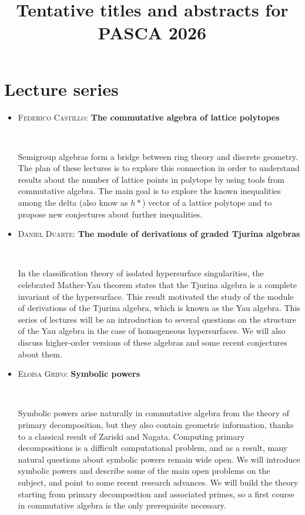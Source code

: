 \documentclass[12pt]{amsart}
\begin{document}
\title{Tentative titles and abstracts for PASCA 2026}
\maketitle

\section*{Lecture series}

\vfill


\begin{itemize}

\item \textsc{Federico Castillo:} \textbf{The commutative algebra of lattice polytopes}

\

\noindent Semigroup algebras form a bridge between ring theory and discrete geometry. The plan of these lectures is to explore this connection in order to understand results about the number of lattice points in polytope by using tools from commutative algebra. The main goal is to explore the known inequalities among the delta (also know as $h*$) vector of a lattice polytope and to propose new conjectures about further inequalities.

\vfill

\item  \textsc{Daniel Duarte:} \textbf{The module of derivations of graded Tjurina algebras}

\

\noindent In the classification theory of isolated hypersurface singularities, the celebrated Mather-Yau theorem states that the Tjurina algebra is a complete invariant of the hypersurface. This result motivated the study of the module of derivations of the Tjurina algebra, which is known as the Yau algebra. This series of lectures will be an introduction to several questions on the structure of the Yau algebra in the case of homogeneous hypersurfaces. We will also discuss higher-order versions of these algebras and some recent conjectures about them.

\vfill

\item \textsc{Elo\'isa Grifo:} \textbf{Symbolic powers}

\

\noindent Symbolic powers arise naturally in commutative algebra from the theory of primary decomposition, but they also contain geometric information, thanks to a classical result of Zariski and Nagata. Computing primary decompositions is a difficult computational problem, and as a result, many natural questions about symbolic powers remain wide open. We will introduce symbolic powers and describe some of the main open problems on the subject, and point to some recent research advances. We will build the theory starting from primary decomposition and associated primes, so a first course in commutative algebra is the only prerequisite necessary.


\end{itemize}
\end{document}
